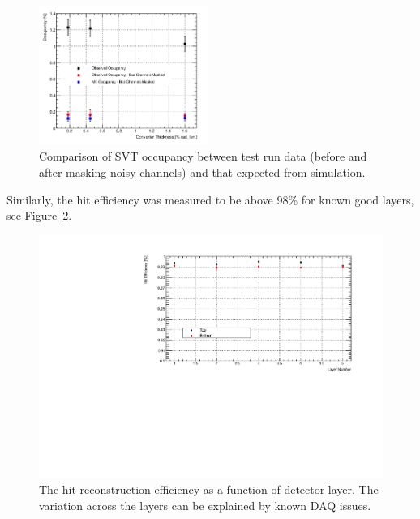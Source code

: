 \begin{figure}[h]
    \includegraphics[width=0.49\textwidth]{test2012/svtperformance/daq/occupancy_vs_target_thick.pdf}
        \caption{ { \small
                    Comparison of SVT occupancy between test run data (before and after masking noisy channels) and that expected from simulation.
                } }
	\label{fig:data_rates_data_mc_cmp}
\end{figure}
Similarly, the hit efficiency was measured to be above 98\% for known good layers, see Figure~\ref{fig:hit_efficiency}.
\begin{figure}[h]
    	\includegraphics[width=.95\textwidth]{test2012/svtperformance/trk_performance/hit_efficiency_vs_layer.pdf}
        \caption{{\small The hit reconstruction efficiency as a function of detector layer. The variation across the layers can be explained by known DAQ issues.}} 
	\label{fig:hit_efficiency}
\end{figure}

